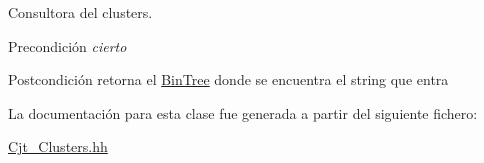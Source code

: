 Consultora del clusters. 

\begin{DoxyPrecond}{Precondición}
{\itshape cierto} 
\end{DoxyPrecond}
\begin{DoxyPostcond}{Postcondición}
retorna el \hyperlink{class_bin_tree}{Bin\+Tree} donde se encuentra el string que entra 
\end{DoxyPostcond}


La documentación para esta clase fue generada a partir del siguiente fichero\+:\begin{DoxyCompactItemize}
\item 
\hyperlink{_cjt___clusters_8hh}{Cjt\+\_\+\+Clusters.\+hh}\end{DoxyCompactItemize}
